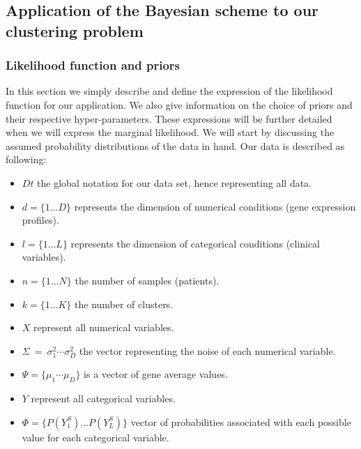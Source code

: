 \documentclass[twocolumn,12pt]{article}
\begin{document}
\subsection{Application of the Bayesian scheme to our clustering problem}

\subsubsection{Likelihood function and priors}

In this section we simply describe and define the expression of the likelihood function for our application. We also give information on the choice of priors and their respective hyper-parameters.
These expressions will be further detailed when we will express the marginal likelihood.
We will start by discussing the assumed probability distributions of the data in hand.
Our data is described as following:
\begin{itemize}
    \item $Dt$ the global notation for our data set, hence representing all data.
    \item $d=\{1\dots D\}$ represents the dimension of numerical conditions (gene expression profiles).
    \item $l=\{1\dots L\}$ represents the dimension of categorical conditions (clinical variables).
    \item $n=\{1\dots N\}$ the number of samples (patients).
    \item $k=\{1\dots K\}$ the number of clusters.
    \item $X$ represent all numerical variables.
    \item $\Sigma\ =\ {\sigma_1^2\cdots\sigma_D^2}$ the vector representing the noise of each numerical variable.
    \item $\Psi=\{\mu_1\cdots \mu_D\}$ is a vector of gene average values.
    \item $Y$ represent all categorical variables.
    \item $\Phi=\{P(Y_{1}^S)\dots P(Y_{L}^S)\}$ vector of probabilities associated with each possible value for each categorical variable.
\end{itemize}
\end{document}
